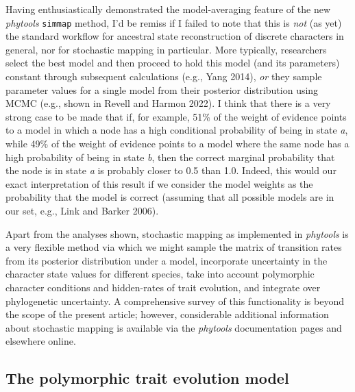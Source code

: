 \documentclass[fleqn,10pt,lineno]{wlpeerj} %
\begin{document}
Having enthusiastically demonstrated the model-averaging feature of the new \emph{phytools} \texttt{simmap} method, I'd be remiss if I failed to note that this is \emph{not} (as yet) the standard workflow for ancestral state reconstruction of discrete characters in general, nor for stochastic mapping in particular. More typically, researchers select the best model and then proceed to hold this model (and its parameters) constant through subsequent calculations (e.g., Yang 2014), \emph{or} they sample parameter values for a single model from their posterior distribution using MCMC (e.g., shown in Revell and Harmon 2022). I think that there is a very strong case to be made that if, for example, 51\% of the weight of evidence points to a model in which a node has a high conditional probability of being in state \emph{a}, while 49\% of the weight of evidence points to a model where the same node has a high probability of being in state \emph{b}, then the correct marginal probability that the node is in state \emph{a} is probably closer to 0.5 than 1.0. Indeed, this would our exact interpretation of this result if we consider the model weights as the probability that the model is correct (assuming that all possible models are in our set, e.g., Link and Barker 2006).

Apart from the analyses shown, stochastic mapping as implemented in \emph{phytools} is a very flexible method via which we might sample the matrix of transition rates from its posterior distribution under a model, incorporate uncertainty in the character state values for different species, take into account polymorphic character conditions and hidden-rates of trait evolution, and integrate over phylogenetic uncertainty. A comprehensive survey of this functionality is beyond the scope of the present article; however, considerable additional information about stochastic mapping is available via the \emph{phytools} documentation pages and elsewhere online.

\hypertarget{the-polymorphic-trait-evolution-model}{%
\subsection{The polymorphic trait evolution model}\label{the-polymorphic-trait-evolution-model}}
\end{document}
